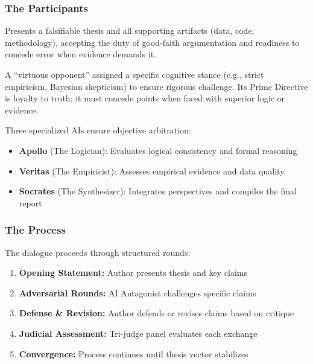 \documentclass[11pt,a4paper]{article}
\begin{document}
\begin{small}
\subsubsection{The Participants}
\begin{description}[style=nextline]
    \item[\textbf{Blue Corner (The Author)}] Presents a falsifiable thesis and all supporting artifacts (data, code, methodology), accepting the duty of good-faith argumentation and readiness to concede error when evidence demands it.
    
    \item[\textbf{Red Corner (The AI Antagonist)}] A ``virtuous opponent'' assigned a specific cognitive stance (e.g., strict empiricism, Bayesian skepticism) to ensure rigorous challenge. Its Prime Directive is loyalty to truth; it must concede points when faced with superior logic or evidence.
    
    \item[\textbf{The Judicial Panel}] Three specialized AIs ensure objective arbitration:
    \begin{itemize}[nosep]
        \item \textbf{Apollo} (The Logician): Evaluates logical consistency and formal reasoning
        \item \textbf{Veritas} (The Empiricist): Assesses empirical evidence and data quality
        \item \textbf{Socrates} (The Synthesizer): Integrates perspectives and compiles the final report
    \end{itemize}
\end{description}

\subsubsection{The Process}
The dialogue proceeds through structured rounds:
\begin{enumerate}[nosep]
    \item \textbf{Opening Statement:} Author presents thesis and key claims
    \item \textbf{Adversarial Rounds:} AI Antagonist challenges specific claims
    \item \textbf{Defense \& Revision:} Author defends or revises claims based on critique
    \item \textbf{Judicial Assessment:} Tri-judge panel evaluates each exchange
    \item \textbf{Convergence:} Process continues until thesis vector stabilizes
\end{enumerate}


\end{small}
\end{document}
